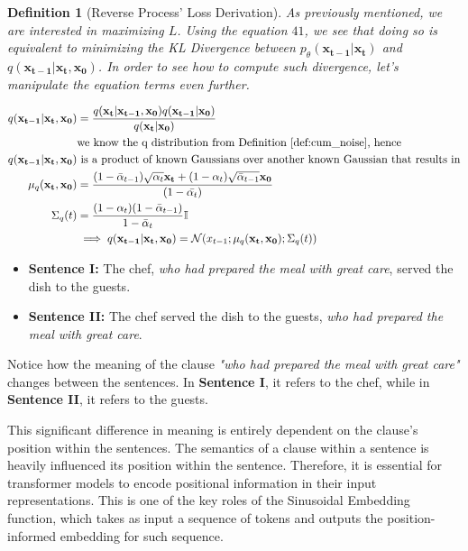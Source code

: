 \documentclass{article}
\newtheorem{definition}{Definition}[section]
\begin{document}
\begin{definition}[Reverse Process' Loss Derivation]
	As previously mentioned, we are interested in maximizing $L$. Using the equation $41$, we see that doing so is equivalent to minimizing the KL Divergence between $p_\theta (\mathbf{x_{t-1} | x_t})$ and $q(\mathbf{x_{t-1} | x_t,  x_0})$. In order to see how to compute such divergence, let's manipulate the equation terms even further.
	
	\begin{align}
		 q(\mathbf{x_{t-1} | x_t,  x_0}) &= \frac{q(\mathbf{x_t | x_{t-1}, x_0}) q(\mathbf{x_{t-1}|x_0})}{q(\mathbf{x_t | x_0})} \\
		 & \text{we know the q distribution from Definition \ref{def:cum_noise}, hence } \\ 
		  q(\mathbf{x_{t-1} | x_t,  x_0}) &\text{    is a product of known Gaussians over another known Gaussian that results in} \\
		  \mu_q(\mathbf{x_t, x_0}) &= \frac{(1-\bar{\alpha}_{t-1})\sqrt{\alpha_t} \mathbf{x_t} + (1- \alpha_t) \sqrt{\bar{\alpha}_{t-1}  } \mathbf{x_0}}{(1-\bar{\alpha_t})} \\
		  \Sigma_q(t) &= \frac{(1-\alpha_t)(1-\bar{\alpha}_{t-1})}{1 - \bar{\alpha}_t}  \mathbb{I} \\
		  & \implies  q(\mathbf{x_{t-1} | x_t,  x_0}) =   \mathcal{N}(x_{t-1};  \mu_q(\mathbf{x_t, x_0}); \Sigma_q(t))
	\end{align}
	
	
\end{definition}









\begin{itemize}
	\item \textbf{Sentence I:} The chef, \textit{who had prepared the meal with great care}, served the dish to the guests.
	\item \textbf{Sentence II:} The chef served the dish to the guests, \textit{who had prepared the meal with great care}.
	
\end{itemize}

Notice how the meaning of the clause \textit{"who had prepared the meal with great care"} changes between the sentences. In \textbf{Sentence I}, it refers to the chef, while in \textbf{Sentence II}, it refers to the guests.

This significant difference in meaning is entirely dependent on the clause's position within the sentences. The semantics of a clause within a sentence is heavily influenced its position within the sentence. Therefore, it is essential for transformer models to encode positional information in their input representations. This is one of the key roles of the Sinusoidal Embedding function, which takes as input a sequence of tokens and outputs the position-informed embedding for such sequence.
\end{document}
